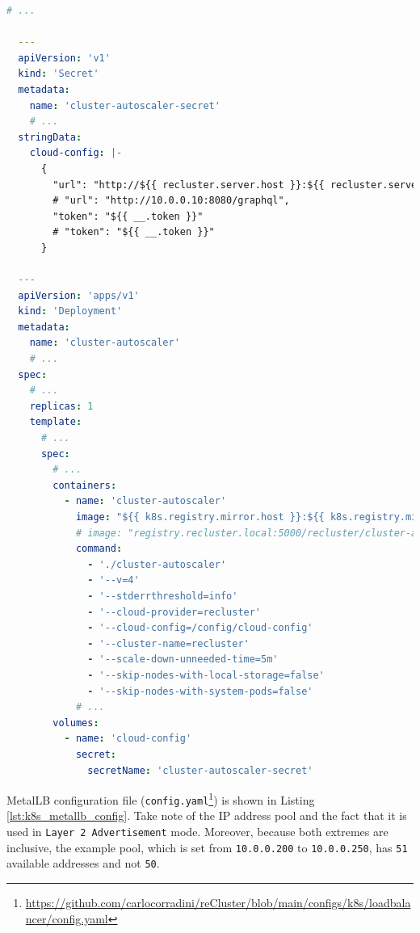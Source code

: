 \begin{lstlisting}[language=yaml, alsoletter={.-1}, morekeywords={1}, morekeywords={[2]{apiVersion, kind, metadata, name, namespace, stringData, cloud-config, labels, app, spec, replicas, selector, matchLabels, template, serviceAccountName, tolerations, containers, image, command, volumeMounts, mountPath, readOnly, volumes, secret, secretName}}, xleftmargin=\parindent, label={lst:k8s_autoscaler_deployment}, caption=Cluster Autoscaler deployment file]
  # ...

  ---
  apiVersion: 'v1'
  kind: 'Secret'
  metadata:
    name: 'cluster-autoscaler-secret'
    # ...
  stringData:
    cloud-config: |-
      {
        "url": "http://${{ recluster.server.host }}:${{ recluster.server.port }}                                /${{ recluster.server.path }}",
        # "url": "http://10.0.0.10:8080/graphql",
        "token": "${{ __.token }}"
        # "token": "${{ __.token }}"
      }

  ---
  apiVersion: 'apps/v1'
  kind: 'Deployment'
  metadata:
    name: 'cluster-autoscaler'
    # ...
  spec:
    # ...
    replicas: 1
    template:
      # ...
      spec:
        # ...
        containers:
          - name: 'cluster-autoscaler'
            image: "${{ k8s.registry.mirror.host }}:${{ k8s.registry.mirror.port }}/recluster                       /cluster-autoscaler"
            # image: "registry.recluster.local:5000/recluster/cluster-autoscaler"
            command:
              - './cluster-autoscaler'
              - '--v=4'
              - '--stderrthreshold=info'
              - '--cloud-provider=recluster'
              - '--cloud-config=/config/cloud-config'
              - '--cluster-name=recluster'
              - '--scale-down-unneeded-time=5m'
              - '--skip-nodes-with-local-storage=false'
              - '--skip-nodes-with-system-pods=false'
            # ...
        volumes:
          - name: 'cloud-config'
            secret:
              secretName: 'cluster-autoscaler-secret'
\end{lstlisting}

MetalLB configuration file (\texttt{config.yaml}\footnote{\url{https://github.com/carlocorradini/reCluster/blob/main/configs/k8s/loadbalancer/config.yaml}})
is shown in Listing \ref{lst:k8s_metallb_config}. Take note of the IP address
pool and the fact that it is used in \texttt{Layer 2 Advertisement} mode.
Moreover, because both extremes are inclusive, the example pool, which is set from
\texttt{10.0.0.200} to \texttt{10.0.0.250}, has \texttt{51} available addresses and
not \texttt{50}.

